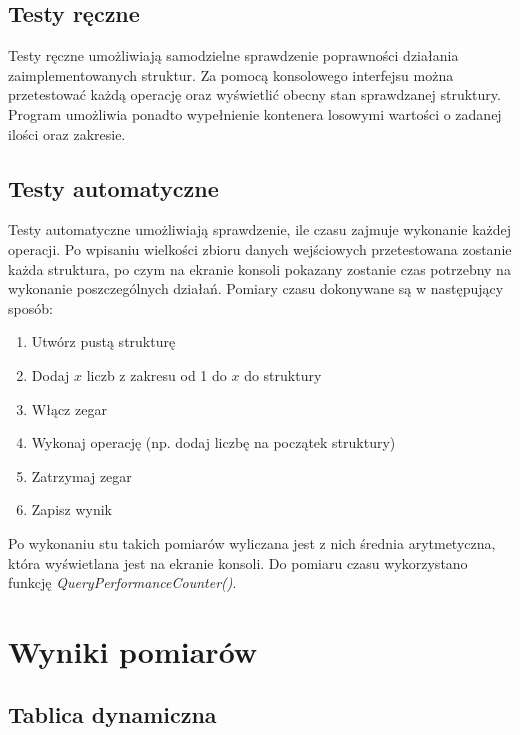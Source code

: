 \documentclass{article}
\begin{document}
\subsection{Testy ręczne}
Testy ręczne umożliwiają samodzielne sprawdzenie poprawności działania zaimplementowanych struktur. Za pomocą konsolowego interfejsu można przetestować każdą operację oraz wyświetlić obecny stan sprawdzanej struktury. Program umożliwia ponadto wypełnienie kontenera losowymi wartości o zadanej ilości oraz zakresie.
\subsection{Testy automatyczne}
Testy automatyczne umożliwiają sprawdzenie, ile czasu zajmuje wykonanie każdej operacji. Po wpisaniu wielkości zbioru danych wejściowych przetestowana zostanie każda struktura, po czym na ekranie konsoli pokazany zostanie czas potrzebny na wykonanie poszczególnych działań. Pomiary czasu dokonywane są w następujący sposób:
\begin{enumerate}
    \item Utwórz pustą strukturę
    \item Dodaj $x$ liczb z zakresu od 1 do $x$ do struktury
    \item Włącz zegar
    \item Wykonaj operację (np. dodaj liczbę na początek struktury)
    \item Zatrzymaj zegar
    \item Zapisz wynik
\end{enumerate}
Po wykonaniu stu takich pomiarów wyliczana jest z nich średnia arytmetyczna, która wyświetlana jest na ekranie konsoli.
Do pomiaru czasu wykorzystano funkcję \textit{QueryPerformanceCounter()}.

\newpage
\section{Wyniki pomiarów}



\subsection{Tablica dynamiczna}
\end{document}

